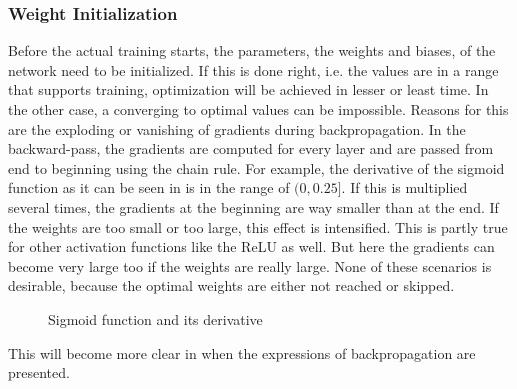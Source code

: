 \subsubsection{Weight Initialization}
\label{sec:training-weight-initialization}
Before the actual training starts, the parameters, the weights and biases, of the network need to be initialized.
If this is done right, i.e. the values are in a range that supports training, optimization will be achieved in lesser or least time.
In the other case, a converging to optimal values can be impossible.
Reasons for this are the exploding or vanishing of gradients during backpropagation\cite{Hochreiter1991}.
In the backward-pass, the gradients are computed for every layer and are passed from end to beginning using the chain rule.
For example, the derivative of the sigmoid function as it can be seen in  is in the range of $(0, 0.25]$.
If this is multiplied several times, the gradients at the beginning are way smaller than at the end.
If the weights are too small or too large, this effect is intensified.
This is partly true for other activation functions like the ReLU as well.
But here the gradients can become very large too if the weights are really large.
None of these scenarios is desirable, because the optimal weights are either not reached or skipped.
\begin{figure}
	\setlength{}
	\setlength{}
	\centering
	
	\caption{Sigmoid function and its derivative}
	\label{fig:sigmoid-derivative}
\end{figure}
This will become more clear in  when the expressions of backpropagation are presented.

